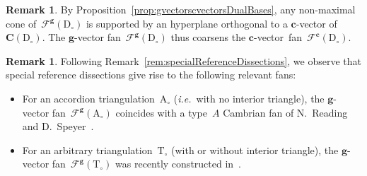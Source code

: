 \documentclass{amsart}
\theoremstyle{definition}
\newtheorem{remark}[theorem]{Remark}
\renewcommand{\b}[1]{\mathbf{#1}} %
\newcommand{\ie}{\textit{i.e.}~} %
\newcommand{\triangulation}{\mathrm{T}} %
\newcommand{\dissection}{\mathrm{D}} %
\newcommand{\accordion}{\mathrm{A}} %
\newcommand{\gvectorFan}{\mathcal{F}^\mathbf{g}} %
\newcommand{\allcvectors}[1]{\mathbf{C}(#1)} %
\newcommand{\cvectorFan}{\mathcal{F}^\mathbf{c}} %
\begin{document}
\begin{remark}
By Proposition~\ref{prop:gvectorscvectorsDualBases}, any non-maximal cone of~$\gvectorFan(\dissection_\circ)$ is supported by an hyperplane orthogonal to a $\b{c}$-vector of~$\allcvectors{\dissection_\circ}$. The $\b{g}$-vector fan~$\gvectorFan(\dissection_\circ)$ thus coarsens the $\b{c}$-vector~fan~$\cvectorFan(\dissection_\circ)$.
\end{remark}

\begin{remark}
Following Remark~\ref{rem:specialReferenceDissections}, we observe that special reference dissections give rise to the following relevant fans:
\begin{itemize}
\item For an accordion triangulation~$\accordion_\circ$ (\ie with no interior triangle), the $\b{g}$-vector fan~$\gvectorFan(\accordion_\circ)$ coincides with a type~$A$ Cambrian fan of N.~Reading and D.~Speyer~\cite{ReadingSpeyer}.
\item For an arbitrary triangulation~$\triangulation_\circ$ (with or without interior triangle), the $\b{g}$-vector fan~$\gvectorFan(\triangulation_\circ)$ was recently constructed in~\cite{HohlwegPilaudStella}.
\end{itemize}
\end{remark}
\end{document}
